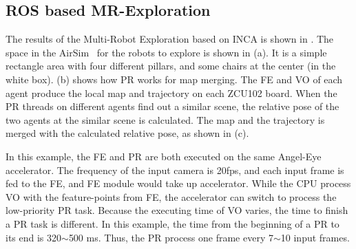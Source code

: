 

\subsection{ ROS based MR-Exploration }


The results of the Multi-Robot Exploration based on INCA is shown in . The space in the AirSim~\cite{shah2018airsim} for the robots to explore is shown in (a). It is a simple rectangle area with four different pillars, and some chairs at the center (in the white box).  (b) shows how PR works for map merging. The FE and VO of each agent produce the local map and trajectory on each ZCU102 board. When the PR threads on different agents find out a similar scene, the relative pose of the two agents at the similar scene is calculated. The map and the trajectory is merged with the calculated relative pose, as shown in (c).

In this example, the FE and PR are both executed on the same Angel-Eye accelerator. The frequency of the input camera is 20fps, and each input frame is fed to the FE, and FE module would take up accelerator. While the CPU process VO with the feature-points from FE, the accelerator can switch to process the low-priority PR task. Because the executing time of VO varies, the time to finish a PR task is different. In this example, the time from the beginning of a PR to its end is 320$\sim$500 ms. Thus, the PR process one frame every 7$\sim$10 input frames.